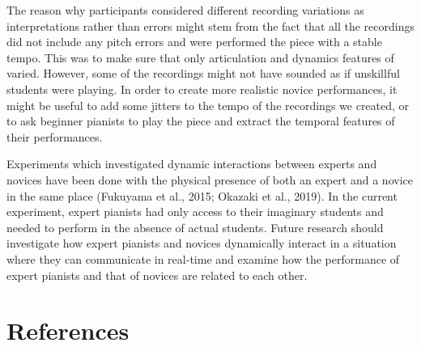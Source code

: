 \documentclass[
  man,floatsintext]{apa6}
\begin{document}
The reason why participants considered different recording variations as interpretations rather than errors might stem from the fact that all the recordings did not include any pitch errors and were performed the piece with a stable tempo. This was to make sure that only articulation and dynamics features of varied. However, some of the recordings might not have sounded as if unskillful students were playing. In order to create more realistic novice performances, it might be useful to add some jitters to the tempo of the recordings we created, or to ask beginner pianists to play the piece and extract the temporal features of their performances.

Experiments which investigated dynamic interactions between experts and novices have been done with the physical presence of both an expert and a novice in the same place (Fukuyama et al., 2015; Okazaki et al., 2019). In the current experiment, expert pianists had only access to their imaginary students and needed to perform in the absence of actual students. Future research should investigate how expert pianists and novices dynamically interact in a situation where they can communicate in real-time and examine how the performance of expert pianists and that of novices are related to each other.

\clearpage

\hypertarget{references}{%
\section{References}\label{references}}

\begingroup
\setlength{\parindent}{-0in}
\setlength{\leftskip}{0in}
\end{document}

